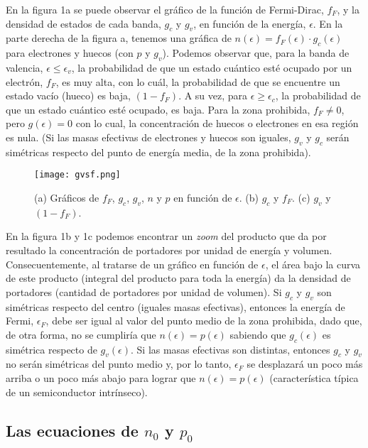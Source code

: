 \documentclass[12pt,a4paper]{article}
\begin{document}
En la figura 1a se puede observar el gráfico de la función de Fermi-Dirac, $f_{F}$, y la densidad de estados de cada banda, $g_{c}$ y $g_{v}$, en función de la energía, $\epsilon$. En la parte derecha de la figura a, tenemos una gráfica de $n(\epsilon)=f_{F}(\epsilon) \cdot g_{c}(\epsilon)$ para electrones y huecos (con $p$ y $g_{v}$). Podemos observar que, para la banda de valencia, $\epsilon \leq \epsilon _{v}$, la probabilidad de que un estado cuántico esté ocupado por un electrón, $f_{F}$, es muy alta, con lo cuál, la probabilidad de que se encuentre un estado vacío (hueco) es baja, $(1-f_{F})$. A su vez, para $\epsilon \geq \epsilon _{c}$, la probabilidad de que un estado cuántico esté ocupado, es baja. Para la zona prohibida, $f_{F}\neq 0$, pero $g(\epsilon)=0$ con lo cual, la concentración de huecos o electrones en esa región es nula. (Si las masas efectivas de electrones y huecos son iguales, $g_{v}$ y $g_{c}$ serán simétricas respecto del punto de energía media, de la zona prohibida).

\begin{figure}[ht!]
\begin{center}
\texttt{[image: gvsf.png]}
\caption{(a) Gráficos de $f_{F}$, $g_{c}$, $g_{v}$, $n$ y $p$ en función de $\epsilon$. (b) $g_{c}$ y $f_{F}$. (c) $g_{v}$ y $(1-f_{F})$.}
\end{center}
\end{figure}

En la figura 1b y 1c podemos encontrar un \emph{zoom} del producto que da por resultado la concentración de portadores por unidad de energía y volumen. Consecuentemente, al tratarse de un gráfico en función de $\epsilon$, el área bajo la curva de este producto (integral del producto para toda la energía) da la densidad de portadores (cantidad de portadores por unidad de volumen). Si $g_{c}$ y $g_{v}$ son simétricas respecto del centro (iguales masas efectivas), entonces la energía de Fermi, $\epsilon _{F}$, debe ser igual al valor del punto medio de la zona prohibida, dado que, de otra forma, no se cumpliría que $n(\epsilon)=p(\epsilon)$ sabiendo que $g_{c}(\epsilon)$ es simétrica respecto de $g_{v}(\epsilon)$. Si las masas efectivas son distintas, entonces $g_{c}$ y $g_{v}$ no serán simétricas del punto medio y, por lo tanto, $\epsilon _{F}$ se desplazará un poco más arriba o un poco más abajo para lograr que $n(\epsilon)=p(\epsilon)$ (característica típica de un semiconductor intrínseco).

\subsection{Las ecuaciones de $n_{0}$ y $p_{0}$}
\end{document}
